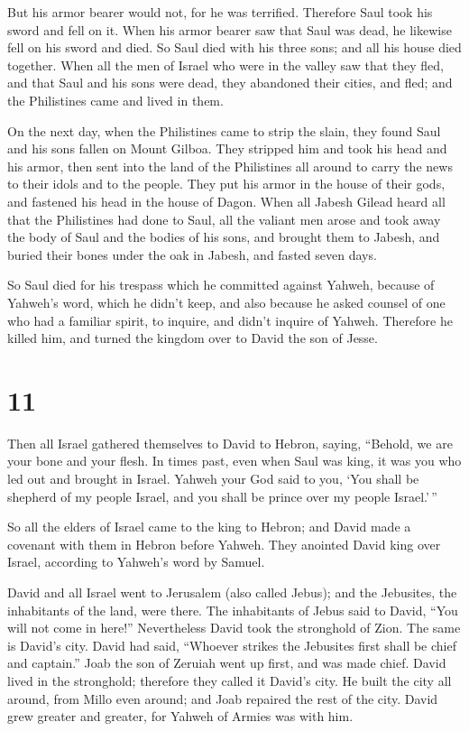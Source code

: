 But his armor bearer would not, for he was terrified. Therefore Saul
took his sword and fell on it.  When his armor bearer saw
that Saul was dead, he likewise fell on his sword and died.
 So Saul died with his three sons; and all his house died
together.  When all the men of Israel who were in the
valley saw that they fled, and that Saul and his sons were dead, they
abandoned their cities, and fled; and the Philistines came and lived in
them.

 On the next day, when the Philistines came to strip the
slain, they found Saul and his sons fallen on Mount Gilboa.
 They stripped him and took his head and his armor, then
sent into the land of the Philistines all around to carry the news to
their idols and to the people.  They put his armor in the
house of their gods, and fastened his head in the house of Dagon.
 When all Jabesh Gilead heard all that the Philistines
had done to Saul,  all the valiant men arose and took
away the body of Saul and the bodies of his sons, and brought them to
Jabesh, and buried their bones under the oak in Jabesh, and fasted seven
days.

 So Saul died for his trespass which he committed against
Yahweh, because of Yahweh's word, which he didn't keep, and also because
he asked counsel of one who had a familiar spirit, to inquire,
 and didn't inquire of Yahweh. Therefore he killed him,
and turned the kingdom over to David the son of Jesse.

\hypertarget{section-10}{%
\section{11}\label{section-10}}

 Then all Israel gathered themselves to David to Hebron,
saying, ``Behold, we are your bone and your flesh.  In
times past, even when Saul was king, it was you who led out and brought
in Israel. Yahweh your God said to you, `You shall be shepherd of my
people Israel, and you shall be prince over my people Israel.'\,''

 So all the elders of Israel came to the king to Hebron;
and David made a covenant with them in Hebron before Yahweh. They
anointed David king over Israel, according to Yahweh's word by Samuel.

 David and all Israel went to Jerusalem (also called
Jebus); and the Jebusites, the inhabitants of the land, were there.
 The inhabitants of Jebus said to David, ``You will not
come in here!'' Nevertheless David took the stronghold of Zion. The same
is David's city.  David had said, ``Whoever strikes the
Jebusites first shall be chief and captain.'' Joab the son of Zeruiah
went up first, and was made chief.  David lived in the
stronghold; therefore they called it David's city.  He
built the city all around, from Millo even around; and Joab repaired the
rest of the city.  David grew greater and greater, for
Yahweh of Armies was with him.

